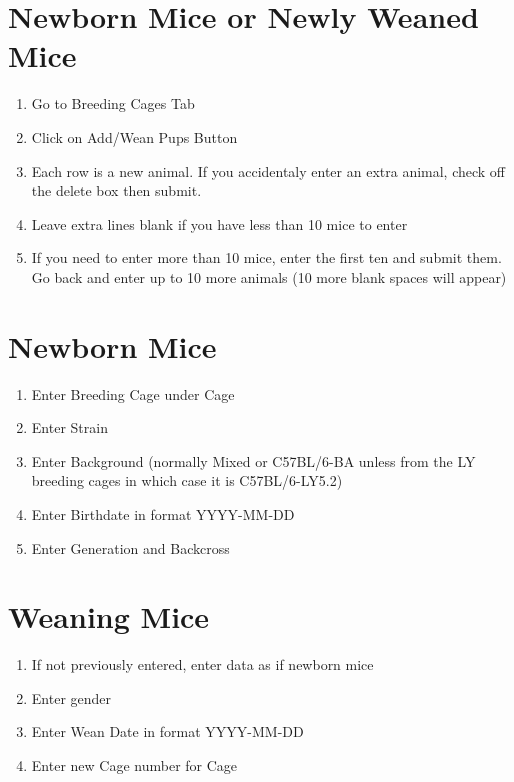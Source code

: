 \documentclass[letterpaper,10pt,english]{sphinxmanual}
\begin{document}
\section{Newborn Mice or Newly Weaned Mice}
\begin{enumerate}
\item {} 
Go to Breeding Cages Tab

\item {} 
Click on Add/Wean Pups Button

\item {} 
Each row is a new animal.  If you accidentaly enter an extra animal, check off the delete box then submit.

\item {} 
Leave extra lines blank if you have less than 10 mice to enter

\item {} 
If you need to enter more than 10 mice, enter the first ten and submit them.  Go back and enter up to 10 more animals (10 more blank spaces will appear)

\end{enumerate}


\section{Newborn Mice}
\begin{enumerate}
\item {} 
Enter Breeding Cage under Cage

\item {} 
Enter Strain

\item {} 
Enter Background (normally Mixed or C57BL/6-BA unless from the LY breeding cages in which case it is C57BL/6-LY5.2)

\item {} 
Enter Birthdate in format YYYY-MM-DD

\item {} 
Enter Generation and Backcross

\end{enumerate}


\section{Weaning Mice}
\begin{enumerate}
\item {} 
If not previously entered, enter data as if newborn mice

\item {} 
Enter gender

\item {} 
Enter Wean Date in format YYYY-MM-DD

\item {} 
Enter new Cage number for Cage

\end{enumerate}
\end{document}
